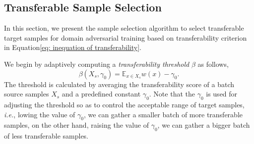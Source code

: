 \subsection{Transferable Sample Selection}
In this section, we present the sample selection algorithm to select transferable target samples for domain adversarial training based on transferability criterion in Equation\ref{eq: inequation of transferability}. 

We begin by adaptively computing a \textit{transferability threshold} $\beta$ as follows, 
\begin{equation}
    \label{eq: transferability thresholded}
    \beta(X_s, \gamma_0) = \mathbb{E}_{x \in X_s} w(x) - \gamma_0.
\end{equation}
The threshold is calculated by averaging the transferability score of a batch source samples $X_s$ and a predefined constant $\gamma_0$. 
Note that the $\gamma_0$ is used for adjusting the threshold so as to control the acceptable range of target samples, \textit{i.e.}, lowing the value of $\gamma_0$, we can gather a smaller batch of more transferable samples, on the other hand, raising the value of $\gamma_0$, we can gather a bigger batch of less transferable samples. 

